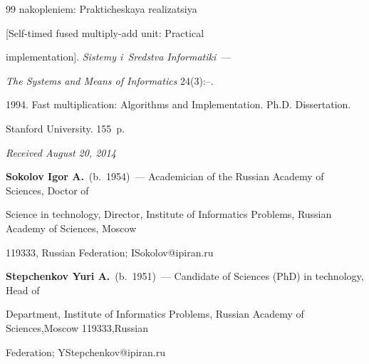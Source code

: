 {{\begin{thebibliography}{99}
nakopleniem: Prak\-ti\-che\-skaya realizatsiya

[Self-timed fused multiply-add unit: Practical

implementation]. \textit{Sistemy i~Sredstva Informatiki}~---

\textit{The Systems and Means of Informatics} 24(3):\pageref{step2}--\pageref{step2-end}.


 1994. Fast multiplication: Algorithms and Implementation. Ph.D. Dissertation.

Stanford University. 155~p.



\end{thebibliography}

} }








\vspace*{-2pt}



\hfill{\small\textit{Received August 20, 2014}}



\vspace*{-4pt}

\Contr



\noindent

\textbf{Sokolov Igor A.}\ (b.\ 1954)~--- Academician of the Russian Academy of Sciences, Doctor of

Science in technology, Director, Institute of Informatics Problems, Russian Academy of Sciences, Moscow

119333, Russian Federation; ISokolov@ipiran.ru



\vspace*{2pt}



\noindent

\textbf{Stepchenkov Yuri A.}\ (b.\ 1951)~--- Candidate of Sciences (PhD) in technology, Head of

Department, Institute of Informatics Problems, Russian Academy of Sciences,Moscow 119333,Russian

Federation; YStepchenkov@ipiran.ru



\vspace*{2pt}



